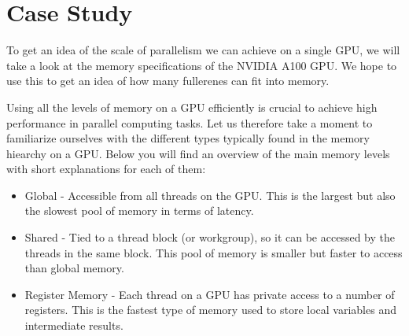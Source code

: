 \section{Case Study}

To get an idea of the scale of parallelism we can achieve on a single GPU, we will take a look at the memory specifications of the NVIDIA A100 GPU. We hope to use this to get an idea of how many fullerenes can fit into memory.

Using all the levels of memory on a GPU efficiently is crucial to achieve high performance in parallel computing tasks. Let us therefore take a moment to familiarize ourselves with the different types typically found in the memory hiearchy on a GPU. Below you will find an overview of the main memory levels with short explanations for each of them:

\begin{itemize}
  \item Global - Accessible from all threads on the GPU. This is the largest but also the slowest pool of memory in terms of latency.
  \item Shared - Tied to a thread block (or workgroup), so it can be accessed by the threads in the same block. This pool of memory is smaller but faster to access than global memory.
  \item Register Memory - Each thread on a GPU has private access to a number of registers. This is the fastest type of memory used to store local variables and intermediate results.
\end{itemize}



